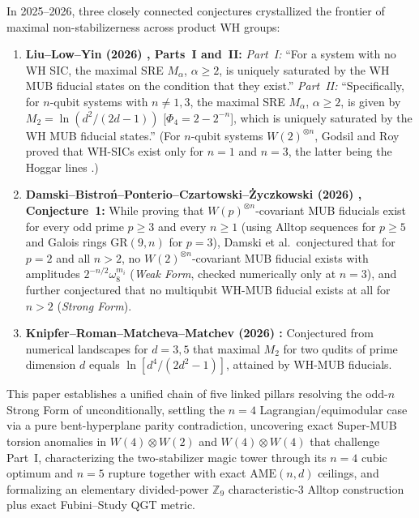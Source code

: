 \documentclass[11pt,reqno]{amsart}
\theoremstyle{definition}
\newcommand{\Z}{\mathbb{Z}}
\begin{document}
In 2025--2026, three closely connected conjectures crystallized the frontier of maximal
non-stabilizerness across product WH groups:
\begin{enumerate}[leftmargin=1.8em]
  \item \textbf{Liu--Low--Yin (2026) \cite{Liu2026MaximalMagic}, Parts~I and~II:}
  \emph{Part~I:} ``For a system with no WH SIC, the maximal SRE $M_\alpha$,
  $\alpha\ge 2$, is uniquely saturated by the WH MUB fiducial states on the condition
  that they exist.'' \emph{Part~II:} ``Specifically, for $n$-qubit systems with
  $n\neq 1,3$, the maximal SRE $M_\alpha$, $\alpha\ge 2$, is given by
  $M_2=\ln(d^2/(2d-1))$ [$\Phi_4=2-2^{-n}$], which is uniquely saturated by the WH MUB
  fiducial states.'' (For $n$-qubit systems $W(2)^{\otimes n}$, Godsil and Roy
  \cite[Lemma~3.1]{Godsil2009Equiangular} proved that WH-SICs exist only for $n=1$
  and $n=3$, the latter being the Hoggar lines \cite{Hoggar1998Lines}.)
  \item \textbf{Damski--Bistro\'n--Ponterio--Czartowski--\.Zyczkowski (2026)
  \cite{Damski2026ProductWH}, Conjecture~1:} While proving that $W(p)^{\otimes n}$-covariant
  MUB fiducials exist for every odd prime $p\ge 3$ and every $n\ge 1$ (using Alltop
  sequences \cite{Alltop1980Complex} for $p\ge 5$ and Galois rings $\mathrm{GR}(9,n)$
  for $p=3$), Damski et al.\ conjectured that for $p=2$ and all $n>2$, no
  $W(2)^{\otimes n}$-covariant MUB fiducial exists with amplitudes
  $2^{-n/2}\omega_8^{m_i}$ (\emph{Weak Form}, checked numerically only at $n=3$), and
  further conjectured that no multiqubit WH-MUB fiducial exists at all for $n>2$
  (\emph{Strong Form}).
  \item \textbf{Knipfer--Roman--Matcheva--Matchev (2026) \cite{Knipfer2026TwoQutrit}:}
  Conjectured from numerical landscapes for $d=3,5$ that maximal $M_2$ for two qudits
  of prime dimension $d$ equals $\ln[d^4/(2d^2-1)]$, attained by WH-MUB fiducials.
\end{enumerate}

This paper establishes a unified chain of five linked pillars resolving the odd-$n$
Strong Form of \cite{Damski2026ProductWH} unconditionally, settling the $n=4$
Lagrangian/equimodular case via a pure bent-hyperplane parity contradiction, uncovering
exact Super-MUB torsion anomalies in $W(4)\otimes W(2)$ and $W(4)\otimes W(4)$ that
challenge \cite{Liu2026MaximalMagic} Part~I, characterizing the two-stabilizer magic
tower through its $n=4$ cubic optimum and $n=5$ rupture together with exact
$\mathrm{AME}(n,d)$ ceilings, and formalizing an elementary divided-power $\Z_9$
characteristic-3 Alltop construction plus exact Fubini--Study QGT metric.
\end{document}
